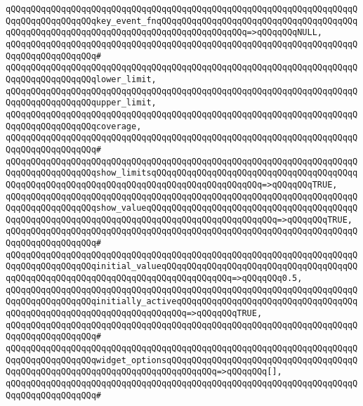 \verb|qQQqqQQqqQQqqQQqqQQqqQQqqQQqqQQqqQQqqQQqqQQqqQQqqQQqqQQqqQQqqQQqqQQqqQQqqQQqqQQqqQQqqQQqkey_event_fnqQQqqQQqqQQqqQQqqQQqqQQqqQQqqQQqqQQqqQQqqQQqqQQqqQQqqQQqqQQqqQQqqQQqqQQqqQQqqQQqqQQqqQQq=>qQQqqQQqNULL,|\newline
\verb|qQQqqQQqqQQqqQQqqQQqqQQqqQQqqQQqqQQqqQQqqQQqqQQqqQQqqQQqqQQqqQQqqQQqqQQqqQQqqQQqqQQqqQQq#|\newline
\verb|qQQqqQQqqQQqqQQqqQQqqQQqqQQqqQQqqQQqqQQqqQQqqQQqqQQqqQQqqQQqqQQqqQQqqQQqqQQqqQQqqQQqqQQqlower_limit,|\newline
\verb|qQQqqQQqqQQqqQQqqQQqqQQqqQQqqQQqqQQqqQQqqQQqqQQqqQQqqQQqqQQqqQQqqQQqqQQqqQQqqQQqqQQqqQQqupper_limit,|\newline
\verb|qQQqqQQqqQQqqQQqqQQqqQQqqQQqqQQqqQQqqQQqqQQqqQQqqQQqqQQqqQQqqQQqqQQqqQQqqQQqqQQqqQQqqQQqcoverage,|\newline
\verb|qQQqqQQqqQQqqQQqqQQqqQQqqQQqqQQqqQQqqQQqqQQqqQQqqQQqqQQqqQQqqQQqqQQqqQQqqQQqqQQqqQQqqQQq#|\newline
\verb|qQQqqQQqqQQqqQQqqQQqqQQqqQQqqQQqqQQqqQQqqQQqqQQqqQQqqQQqqQQqqQQqqQQqqQQqqQQqqQQqqQQqqQQqshow_limitsqQQqqQQqqQQqqQQqqQQqqQQqqQQqqQQqqQQqqQQqqQQqqQQqqQQqqQQqqQQqqQQqqQQqqQQqqQQqqQQqqQQqqQQqqQQq=>qQQqqQQqTRUE,|\newline
\verb|qQQqqQQqqQQqqQQqqQQqqQQqqQQqqQQqqQQqqQQqqQQqqQQqqQQqqQQqqQQqqQQqqQQqqQQqqQQqqQQqqQQqqQQqshow_valueqQQqqQQqqQQqqQQqqQQqqQQqqQQqqQQqqQQqqQQqqQQqqQQqqQQqqQQqqQQqqQQqqQQqqQQqqQQqqQQqqQQqqQQqqQQqqQQq=>qQQqqQQqTRUE,|\newline
\verb|qQQqqQQqqQQqqQQqqQQqqQQqqQQqqQQqqQQqqQQqqQQqqQQqqQQqqQQqqQQqqQQqqQQqqQQqqQQqqQQqqQQqqQQq#|\newline
\verb|qQQqqQQqqQQqqQQqqQQqqQQqqQQqqQQqqQQqqQQqqQQqqQQqqQQqqQQqqQQqqQQqqQQqqQQqqQQqqQQqqQQqqQQqinitial_valueqQQqqQQqqQQqqQQqqQQqqQQqqQQqqQQqqQQqqQQqqQQqqQQqqQQqqQQqqQQqqQQqqQQqqQQqqQQqqQQqqQQq=>qQQqqQQq0.5,|\newline
\verb|qQQqqQQqqQQqqQQqqQQqqQQqqQQqqQQqqQQqqQQqqQQqqQQqqQQqqQQqqQQqqQQqqQQqqQQqqQQqqQQqqQQqqQQqinitially_activeqQQqqQQqqQQqqQQqqQQqqQQqqQQqqQQqqQQqqQQqqQQqqQQqqQQqqQQqqQQqqQQqqQQqqQQq=>qQQqqQQqTRUE,|\newline
\verb|qQQqqQQqqQQqqQQqqQQqqQQqqQQqqQQqqQQqqQQqqQQqqQQqqQQqqQQqqQQqqQQqqQQqqQQqqQQqqQQqqQQqqQQq#|\newline
\verb|qQQqqQQqqQQqqQQqqQQqqQQqqQQqqQQqqQQqqQQqqQQqqQQqqQQqqQQqqQQqqQQqqQQqqQQqqQQqqQQqqQQqqQQqwidget_optionsqQQqqQQqqQQqqQQqqQQqqQQqqQQqqQQqqQQqqQQqqQQqqQQqqQQqqQQqqQQqqQQqqQQqqQQqqQQqqQQq=>qQQqqQQq[],|\newline
\verb|qQQqqQQqqQQqqQQqqQQqqQQqqQQqqQQqqQQqqQQqqQQqqQQqqQQqqQQqqQQqqQQqqQQqqQQqqQQqqQQqqQQqqQQq#|\newline
